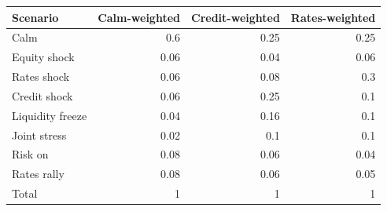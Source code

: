 \begin{tabular}{@{}lrrr@{}}
\toprule
Scenario & Calm-weighted & Credit-weighted & Rates-weighted \\
\midrule
Calm & 0.6 & 0.25 & 0.25 \\
Equity shock & 0.06 & 0.04 & 0.06 \\
Rates shock & 0.06 & 0.08 & 0.3 \\
Credit shock & 0.06 & 0.25 & 0.1 \\
Liquidity freeze & 0.04 & 0.16 & 0.1 \\
Joint stress & 0.02 & 0.1 & 0.1 \\
Risk on & 0.08 & 0.06 & 0.04 \\
Rates rally & 0.08 & 0.06 & 0.05 \\
\midrule
Total & 1 & 1 & 1 \\
\bottomrule
\end{tabular}
